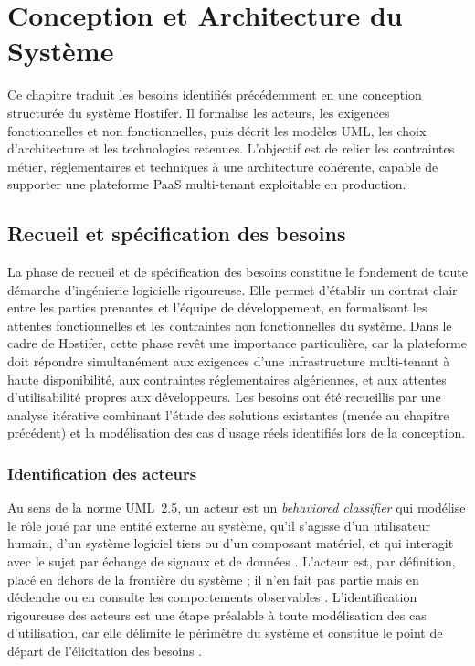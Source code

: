 \chapter{Conception et Architecture du Système}

Ce chapitre traduit les besoins identifiés précédemment en une conception structurée du système Hostifer. Il formalise les acteurs, les exigences fonctionnelles et non fonctionnelles, puis décrit les modèles UML, les choix d'architecture et les technologies retenues. L'objectif est de relier les contraintes métier, réglementaires et techniques à une architecture cohérente, capable de supporter une plateforme PaaS multi-tenant exploitable en production.

\section{Recueil et spécification des besoins}

La phase de recueil et de spécification des besoins constitue le fondement de toute démarche d'ingénierie logicielle rigoureuse. Elle permet d'établir un contrat clair entre les parties prenantes et l'équipe de développement, en formalisant les attentes fonctionnelles et les contraintes non fonctionnelles du système. Dans le cadre de Hostifer, cette phase revêt une importance particulière, car la plateforme doit répondre simultanément aux exigences d'une infrastructure multi-tenant à haute disponibilité, aux contraintes réglementaires algériennes, et aux attentes d'utilisabilité propres aux développeurs. Les besoins ont été recueillis par une analyse itérative combinant l'étude des solutions existantes (menée au chapitre précédent) et la modélisation des cas d'usage réels identifiés lors de la conception.

\subsection{Identification des acteurs}

Au sens de la norme UML~2.5, un acteur est un \textit{behaviored classifier} qui modélise le rôle joué par une entité externe au système, qu'il s'agisse d'un utilisateur humain, d'un système logiciel tiers ou d'un composant matériel, et qui interagit avec le sujet par échange de signaux et de données \cite{uml-spec}. L'acteur est, par définition, placé en dehors de la frontière du système ; il n'en fait pas partie mais en déclenche ou en consulte les comportements observables \cite{booch-uml}. L'identification rigoureuse des acteurs est une étape préalable à toute modélisation des cas d'utilisation, car elle délimite le périmètre du système et constitue le point de départ de l'élicitation des besoins \cite{sommerville-se}.

